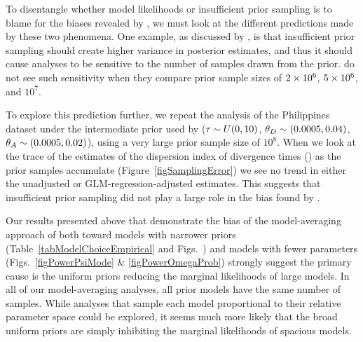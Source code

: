 \documentclass[letterpaper,12pt]{article}
\begin{document}
\begin{linenumbers}
To disentangle whether model likelihoods or insufficient prior sampling is to
blame for the biases revealed by \citet{Oaks2012}, we must look at the
different predictions made by these two phenomena.
One example, as discussed by \citet{Oaks2012}, is that insufficient prior
sampling should create higher variance in posterior estimates, and thus it
should cause analyses to be sensitive to the number of samples drawn from the
prior.
\citet{Oaks2012} do not see such sensitivity when they compare prior sample
sizes of $2\times 10^{6}$, $5\times 10^{6}$, and $10^7$.

To explore this prediction further, we repeat the analysis of the Philippines
dataset under the intermediate prior used by \citet{Oaks2012} ($\tau_{} \sim U(0,
10)$, $\meanDescendantTheta{} \sim (0.0005, 0.04)$, $\ancestralTheta{} \sim
(0.0005, 0.02)$), using a very large prior sample size of $10^8$.
When we look at the trace of the estimates of the dispersion index of
divergence times (\vmratio{}) as the prior samples accumulate
(Figure~\ref{figSamplingError}) we see no trend in either the unadjusted or
GLM-regression-adjusted estimates.
This suggests that insufficient prior sampling did not play a large
role in the bias found by \citet{Oaks2012}.

Our results presented above that demonstrate the bias of the model-averaging
approach of \citet{Hickerson2013} both toward models with narrower \divt{}
priors (Table~\ref{tabModelChoiceEmpirical} and
Figs.~)
and models with fewer \divt{} parameters (Figs.~\ref{figPowerPsiMode} \&
\ref{figPowerOmegaProb}) strongly suggest the primary cause is the uniform
priors reducing the marginal likelihoods of large models.
In all of our model-averaging analyses, all prior models have the same number
of samples.
While analyses that sample each model proportional to their relative parameter
space could be explored, it seems much more likely that the broad uniform
priors are simply inhibiting the marginal likelihoods of spacious models.


\end{linenumbers}
\end{document}
